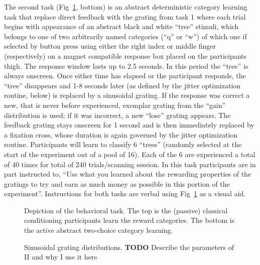 \documentclass[doc,12pt]{apa}        %
\begin{document}
The second task (Fig~\ref{fig:task}, bottom) is an abstract deterministic category learning task that replace direct feedback with the grating from task 1 where each trial begins with appearance of an abstract black and white ``tree'' stimuli, which belongs to one of two arbitrarily named categories (``q'' or ``w'') of which one if selected by button press using either the right index or middle finger (respectively) on a magnet compatible response box placed on the participants thigh.  The response window lasts up to 2.5 seconds.  In this period the ``tree'' is always onscreen.  Once either time has elapsed or the participant responds, the ``tree'' disappears and 1-8 seconds later (as defined by the jitter optimization routine, below) is replaced by a sinusoidal grating.  If the response was correct a new, that is never before experienced, exemplar grating from the ``gain'' distribution is used; if it was incorrect, a new ``lose'' grating appears.  The feedback grating stays onscreen for 1 second and is then immediately replaced by a fixation cross, whose duration is again governed by the jitter optimization routine.  Participants will learn to classify 6 ``trees'' (randomly selected at the start of the experiment out of a pool of 16). Each of the 6 are experienced a total of 40 times for total of 240 trials/scanning session. In this task participants are in part instructed to, ``Use what you learned about the rewarding properties of the gratings to try and earn as much money as possible in this portion of the experiment''.  Instructions for both tasks are verbal using Fig~\ref{fig:task} as a visual aid.

\begin{figure}[tp]
	\label{fig:task}
	\caption{Depiction of the behavioral task. The top is the (passive) classical conditioning participants learn the reward categories.  The bottom is the active abstract two-choice category learning.}
\end{figure}

\begin{figure}[tp]
	\label{fig:II}
	\caption{Sinusoidal grating distributions. \textbf{TODO} Describe the parameters of II and why I use it here}
\end{figure}
\end{document}
